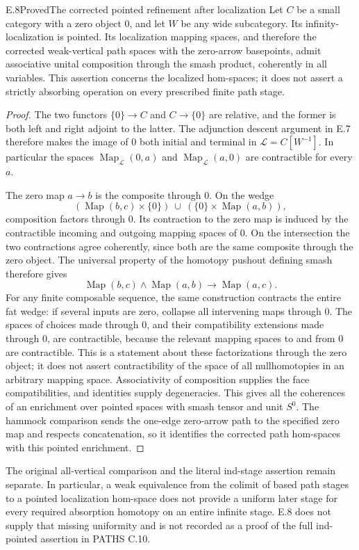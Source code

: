 \begin{result}{E.8}{Proved}{The corrected pointed refinement after localization}
Let $C$ be a small category with a zero object $0$, and let $W$ be any wide subcategory. Its infinity-localization is pointed. Its localization mapping spaces, and therefore the corrected weak-vertical path spaces with the zero-arrow basepoints, admit associative unital composition through the smash product, coherently in all variables. This assertion concerns the localized hom-spaces; it does not assert a strictly absorbing operation on every prescribed finite path stage.
\end{result}
\begin{proof}
The two functors $\{0\}\to C$ and $C\to\{0\}$ are relative, and the former is both left and right adjoint to the latter. The adjunction descent argument in E.7 therefore makes the image of $0$ both initial and terminal in $\mathcal L=C[W^{-1}]$. In particular the spaces $\operatorname{Map}_{\mathcal L}(0,a)$ and $\operatorname{Map}_{\mathcal L}(a,0)$ are contractible for every $a$.

The zero map $a\to b$ is the composite through $0$. On the wedge
\[
 (\operatorname{Map}(b,c)\times\{0\})\ \cup\
 (\{0\}\times\operatorname{Map}(a,b)),
\]
composition factors through $0$. Its contraction to the zero map is induced by the contractible incoming and outgoing mapping spaces of $0$. On the intersection the two contractions agree coherently, since both are the same composite through the zero object. The universal property of the homotopy pushout defining smash therefore gives
\[
 \operatorname{Map}(b,c)\wedge\operatorname{Map}(a,b)
 \longrightarrow\operatorname{Map}(a,c).
\]
For any finite composable sequence, the same construction contracts the entire fat wedge: if several inputs are zero, collapse all intervening maps through $0$. The spaces of choices made through $0$, and their compatibility extensions made through $0$, are contractible, because the relevant mapping spaces to and from $0$ are contractible. This is a statement about these factorizations through the zero object; it does not assert contractibility of the space of all nullhomotopies in an arbitrary mapping space. Associativity of composition supplies the face compatibilities, and identities supply degeneracies. This gives all the coherences of an enrichment over pointed spaces with smash tensor and unit $S^0$. The hammock comparison sends the one-edge zero-arrow path to the specified zero map and respects concatenation, so it identifies the corrected path hom-spaces with this pointed enrichment.
\end{proof}

The original all-vertical comparison and the literal ind-stage assertion remain separate. In particular, a weak equivalence from the colimit of based path stages to a pointed localization hom-space does not provide a uniform later stage for every required absorption homotopy on an entire infinite stage. E.8 does not supply that missing uniformity and is not recorded as a proof of the full ind-pointed assertion in PATHS C.10.
